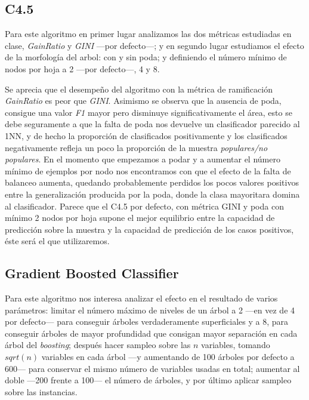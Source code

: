 \documentclass{article}
\newcommand{\img}[2]{
\noindent\makebox[\textwidth][c]{\texttt{[image: \#1]}}%
}
\begin{document}
\subsection{C4.5}

Para este algoritmo en primer lugar analizamos las dos métricas estudiadas en clase, \textit{GainRatio} y \textit{GINI} ---por defecto---; y en segundo lugar estudiamos el efecto de la morfología del arbol: con y sin poda; y definiendo el número mínimo de nodos por hoja a 2 ---por defecto---, 4 y 8. 

\img{c45tuning}{1.2}

Se aprecia que el desempeño del algoritmo con la métrica de ramificación \textit{GainRatio} es peor que \textit{GINI}. Asimismo se observa que la ausencia de poda, consigue una valor \textit{F1} mayor pero disminuye significativamente el área, esto se debe seguramente a que la falta de poda nos devuelve un clasificador parecido al 1NN, y de hecho la proporción de clasificados positivamente y los clasificados negativamente refleja un poco la proporción de la muestra \textit{populares/no populares}. En el momento que empezamos a podar y a aumentar el número mínimo de ejemplos por nodo nos encontramos con que el efecto de la falta de balanceo aumenta, quedando probablemente perdidos los pocos valores positivos entre la generalización producida por la poda, donde la clasa mayoritara domina al clasificador. Parece que el C4.5 por defecto, con métrica GINI y poda con mínimo 2 nodos por hoja supone el mejor equilibrio entre la capacidad de predicción sobre la muestra y la capacidad de predicción de los casos positivos, éste será el que utilizaremos.

\subsection{Gradient Boosted Classifier}

Para este algoritmo nos interesa analizar el efecto en el resultado de varios parámetros: limitar el número máximo de niveles de un árbol a 2 ---en vez de 4 por defecto--- para conseguir árboles verdaderamente superficiales y a 8, para conseguir árboles de mayor profundidad que consigan mayor separación en cada árbol del \textit{boosting}; después hacer sampleo sobre las $n$ variables, tomando $sqrt(n)$ variables en cada árbol ---y aumentando de 100 árboles por defecto a 600--- para conservar el mismo número de variables usadas en total; aumentar al doble ---200 frente a 100--- el número de árboles, y por último aplicar sampleo sobre las instancias.
\end{document}
